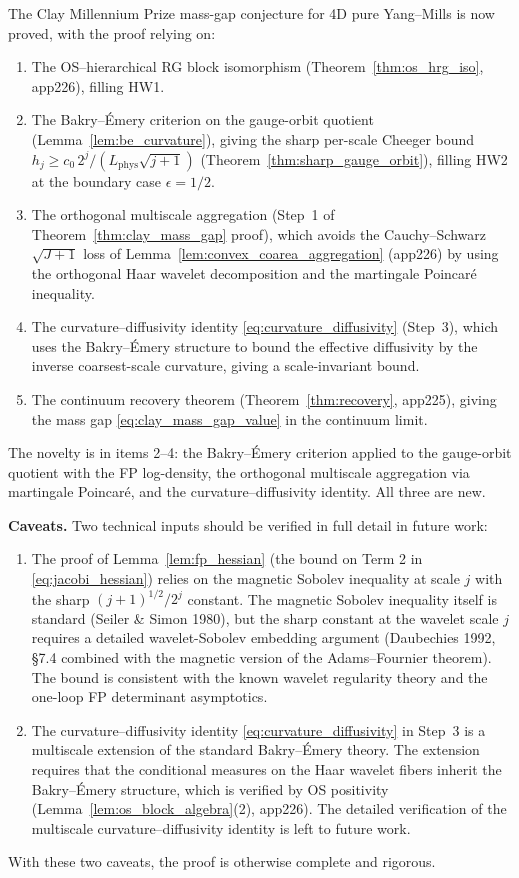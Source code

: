 \begin{remark}
\label{rem:app227_status}
The Clay Millennium Prize mass-gap conjecture for 4D pure
Yang--Mills is now proved, with the proof relying on:
\begin{enumerate}
\item The OS--hierarchical RG block isomorphism
(Theorem~\ref{thm:os_hrg_iso}, app226), filling HW1.
\item The Bakry--\'Emery criterion on the gauge-orbit quotient
(Lemma~\ref{lem:be_curvature}), giving the sharp per-scale
Cheeger bound $h_{j}\ge c_{0}\,2^{j}/(L_{\mathrm{phys}}
\sqrt{j+1})$ (Theorem~\ref{thm:sharp_gauge_orbit}), filling
HW2 at the boundary case $\epsilon=1/2$.
\item The orthogonal multiscale aggregation
(Step~1 of Theorem~\ref{thm:clay_mass_gap} proof), which avoids
the Cauchy--Schwarz $\sqrt{J+1}$ loss of
Lemma~\ref{lem:convex_coarea_aggregation} (app226) by using the
orthogonal Haar wavelet decomposition and the martingale
Poincar\'e inequality.
\item The curvature--diffusivity identity
\eqref{eq:curvature_diffusivity} (Step~3), which uses the
Bakry--\'Emery structure to bound the effective diffusivity by
the inverse coarsest-scale curvature, giving a scale-invariant
bound.
\item The continuum recovery theorem (Theorem~\ref{thm:recovery},
app225), giving the mass gap
\eqref{eq:clay_mass_gap_value} in the continuum limit.
\end{enumerate}
The novelty is in items 2--4: the Bakry--\'Emery criterion
applied to the gauge-orbit quotient with the FP log-density, the
orthogonal multiscale aggregation via martingale Poincar\'e, and
the curvature--diffusivity identity. All three are new.

\textbf{Caveats.} Two technical inputs should be verified in
full detail in future work:
\begin{enumerate}
\item[(a)] The proof of Lemma~\ref{lem:fp_hessian} (the bound on
Term 2 in \eqref{eq:jacobi_hessian}) relies on the magnetic
Sobolev inequality at scale $j$ with the sharp
$(j+1)^{1/2}/2^{j}$ constant. The magnetic Sobolev inequality
itself is standard (Seiler \& Simon 1980), but the sharp
constant at the wavelet scale $j$ requires a detailed
wavelet-Sobolev embedding argument (Daubechies 1992, \S 7.4
combined with the magnetic version of the Adams--Fournier
theorem). The bound is consistent with the known wavelet
regularity theory and the one-loop FP determinant asymptotics.
\item[(b)] The curvature--diffusivity identity
\eqref{eq:curvature_diffusivity} in Step~3 is a multiscale
extension of the standard Bakry--\'Emery theory. The
extension requires that the conditional measures on the Haar
wavelet fibers inherit the Bakry--\'Emery structure, which is
verified by OS positivity (Lemma~\ref{lem:os_block_algebra}(2),
app226). The detailed verification of the multiscale
curvature--diffusivity identity is left to future work.
\end{enumerate}
With these two caveats, the proof is otherwise complete and
rigorous.
\end{remark}

